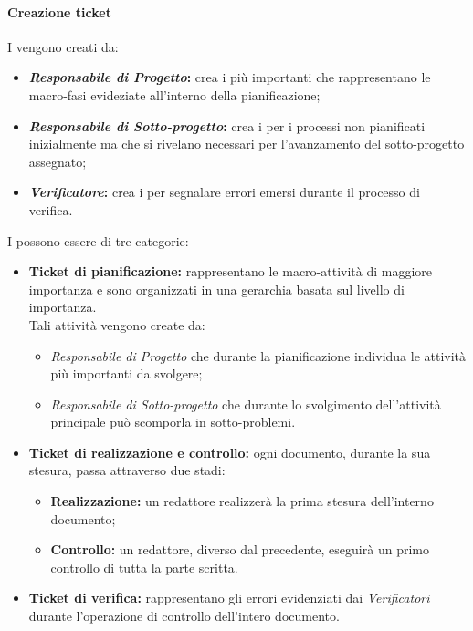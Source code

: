         \paragraph{Creazione ticket}
          I  vengono creati da:
          \begin{itemize}
            \item \textbf{\emph{Responsabile di Progetto}: }crea i  più importanti che rappresentano le macro-fasi evideziate
            all'interno della pianificazione;
            \item \textbf{\emph{Responsabile di Sotto-progetto}: }crea i  per i processi non pianificati inizialmente ma che si rivelano necessari
            per l'avanzamento del sotto-progetto assegnato;
            \item \textbf{\emph{Verificatore}: }crea i  per segnalare errori emersi durante il processo di verifica.
          \end{itemize}
          I  possono essere di tre categorie:
          \begin{itemize}
            \item \textbf{Ticket di pianificazione: }rappresentano le macro-attività di maggiore importanza e sono organizzati in una gerarchia
            basata sul livello di importanza.\\
            Tali attività vengono create da:
            \bgroup
              \begin{itemize}
                \item \emph{Responsabile di Progetto} che durante la pianificazione individua le attività più importanti da svolgere;
                \item \emph{Responsabile di Sotto-progetto} che durante lo svolgimento dell'attività principale può scomporla in sotto-problemi.
              \end{itemize}
            \egroup
            \item \textbf{Ticket di realizzazione e controllo: }ogni documento, durante la sua stesura, passa attraverso due stadi:
            \bgroup
              \begin{itemize}
                \item \textbf{Realizzazione: }un redattore realizzerà la prima stesura dell'interno documento;
                \item \textbf{Controllo: }un redattore, diverso dal precedente, eseguirà un primo controllo di tutta la parte scritta.
              \end{itemize}
            \egroup
            \item \textbf{Ticket di verifica: }rappresentano gli errori evidenziati dai \emph{Verificatori} durante l'operazione di controllo dell'intero documento.
          \end{itemize}
